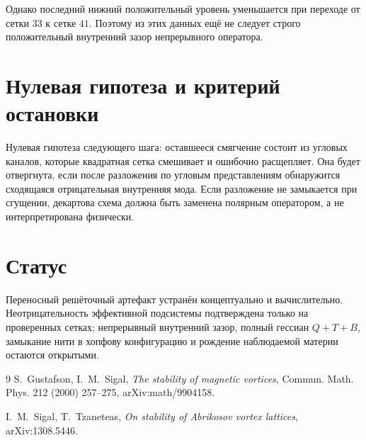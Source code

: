 Однако последний нижний положительный уровень уменьшается при переходе от
сетки $33$ к сетке $41$. Поэтому из этих данных ещё не следует строго
положительный внутренний зазор непрерывного оператора.

\section{Нулевая гипотеза и критерий остановки}

Нулевая гипотеза следующего шага: оставшееся смягчение состоит из угловых
каналов, которые квадратная сетка смешивает и ошибочно расщепляет. Она будет
отвергнута, если после разложения по угловым представлениям обнаружится
сходящаяся отрицательная внутренняя мода. Если разложение не замыкается при
сгущении, декартова схема должна быть заменена полярным оператором, а не
интерпретирована физически.

\section{Статус}

Переносный решёточный артефакт устранён концептуально и вычислительно.
Неотрицательность эффективной подсистемы подтверждена только на проверенных
сетках; непрерывный внутренний зазор, полный гессиан $Q+T+B$, замыкание нити в
хопфову конфигурацию и рождение наблюдаемой материи остаются открытыми.

\begin{thebibliography}{9}
S.~Gustafson, I.~M.~Sigal,
\emph{The stability of magnetic vortices},
Commun. Math. Phys. 212 (2000) 257--275, arXiv:math/9904158.

I.~M.~Sigal, T.~Tzaneteas,
\emph{On stability of Abrikosov vortex lattices},
arXiv:1308.5446.
\end{thebibliography}